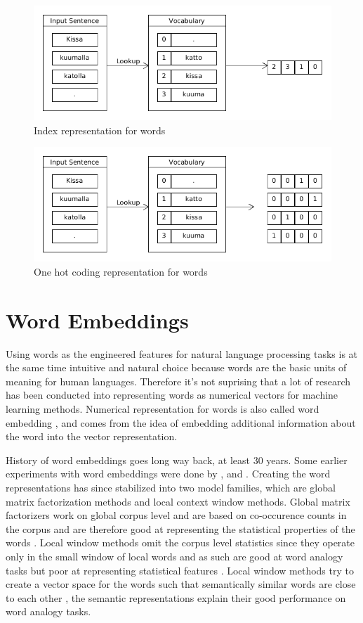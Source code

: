 \documentclass[12pt,a4paper,english
]{tutthesis}
\begin{document}
\begin{figure}[htbp]
\caption{Index representation for words}
\label{figure:index_representation}
\centering
\includegraphics[width=12cm]{index_representation.png}
\end{figure}

\begin{figure}[htbp]
\caption{One hot coding representation for words}
\label{figure:one_hot}
\centering
\includegraphics[width=12cm]{one_hot.png}
\end{figure}

\section{Word Embeddings}
\label{se:word_embeddings}
Using words as the engineered features for natural language processing tasks is at the same time intuitive and natural choice because words are the basic units of meaning for human languages. Therefore it's not suprising that a lot of research has been conducted into representing words as numerical vectors for machine learning methods. Numerical representation for words is also called word embedding \cite{Mikolov2013a}, and comes from the idea of embedding additional information about the word into the vector representation.

History of word embeddings goes long way back, at least 30 years. Some earlier experiments with word embeddings were done by \cite{Hinton1990}, \cite{Hinton1985} and \cite{Elman1990}. Creating the word representations has since stabilized into two model families, which are global matrix factorization methods and local context window methods. Global matrix factorizers work on global corpus level and are based on co-occurence counts in the corpus and are therefore good at representing the statistical properties of the words \cite{Pennington2014}. Local window methods omit the corpus level statistics since they operate only in the small window of local words and as such are good at word analogy tasks but poor at representing statistical features \cite{Pennington2014}. Local window methods try to create a vector space for the words such that semantically similar words are close to each other \cite{Mikolov2013a}, the semantic representations explain their good performance on word analogy tasks.
\end{document}
